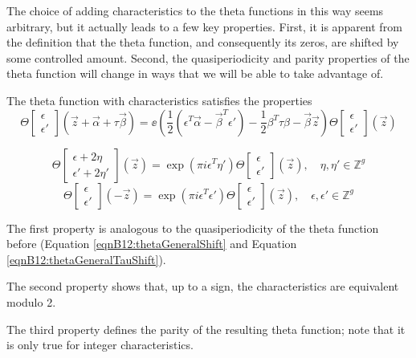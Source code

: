 The choice of adding characteristics to the theta functions in this way seems arbitrary, but it actually leads to a few key properties. First, it is apparent from the definition that the theta function, and consequently its zeros, are shifted by some controlled amount. Second, the quasiperiodicity and parity properties of the theta function will change in ways that we will be able to take advantage of.

\begin{lemma}
    The theta function with characteristics satisfies the properties
    \begin{equation}\Theta\begin{bmatrix}\epsilon \\ \epsilon'\end{bmatrix}(\vec z + \vec \alpha + \tau \vec \beta) =
    \ee\left(\frac{1}{2}(\epsilon^T \vec \alpha - \vec \beta^T \epsilon') - \frac{1}{2} \beta^T \tau \beta - \vec \beta \vec z\right)
    \Theta\begin{bmatrix}\epsilon \\ \epsilon'\end{bmatrix}(\vec z)
    \end{equation}

    \begin{equation}\Theta\begin{bmatrix}\epsilon + 2\eta \\ \epsilon' + 2\eta' \end{bmatrix}(\vec z) = \exp(\pi i \epsilon^T \eta')
    \Theta\begin{bmatrix}\epsilon \\ \epsilon'\end{bmatrix}(\vec z) , \quad \eta,\eta' \in \mathbb Z^g\end{equation}
    \begin{equation}\Theta\begin{bmatrix}\epsilon \\ \epsilon'\end{bmatrix}(-\vec z) = \exp(\pi i \epsilon^T \epsilon') \Theta\begin{bmatrix}\epsilon \\ \epsilon'\end{bmatrix}(\vec z) , \quad \epsilon,\epsilon' \in \mathbb Z^g\end{equation}

    The first property is analogous to the quasiperiodicity of the theta function before (Equation \ref{eqnB12:thetaGeneralShift} and Equation \ref{eqnB12:thetaGeneralTauShift}).
    
    The second property shows that, up to a sign, the characteristics are equivalent modulo 2.
    
    The third property defines the parity of the resulting theta function; note that it is only true for integer characteristics.
\end{lemma}

